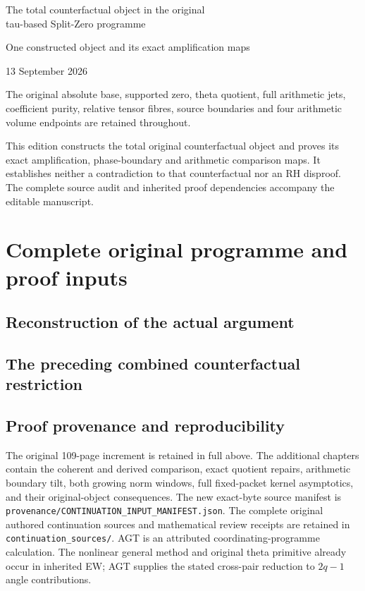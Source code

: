 \documentclass[11pt,a4paper,oneside,openany]{book}
\theoremstyle{definition}
\begin{document}
\frontmatter
\begin{titlepage}
\vspace*{24mm}
{\sffamily\LARGE The total counterfactual object in the original\\[5pt]
tau-based Split-Zero programme\par}
\vspace{12mm}
{\Large One constructed object and its exact amplification maps\par}
\vspace{10mm}
{\large 13 September 2026\par}
\vfill
The original absolute base, supported zero, theta quotient, full arithmetic
jets, coefficient purity, relative tensor fibres, source boundaries and
four arithmetic volume endpoints are retained throughout.

This edition constructs the total original counterfactual object and proves
its exact amplification, phase-boundary and arithmetic comparison maps. It establishes neither a contradiction to that
counterfactual nor an RH disproof. The complete source audit and inherited
proof dependencies accompany the editable manuscript.
\end{titlepage}
\tableofcontents
\mainmatter

\part{Complete original programme and proof inputs}

\chapter{Reconstruction of the actual argument}


\chapter{The preceding combined counterfactual restriction}


\chapter{Proof provenance and reproducibility}
The original 109-page increment is retained in full above. The additional chapters contain the coherent and derived comparison, exact quotient repairs, arithmetic boundary tilt, both growing norm windows, full fixed-packet kernel asymptotics, and their original-object consequences. The new exact-byte source manifest is \nolinkurl{provenance/CONTINUATION_INPUT_MANIFEST.json}. The complete original authored continuation sources and mathematical review receipts are retained in \texttt{continuation\_sources/}. AGT is an attributed coordinating-programme calculation. The nonlinear general method and original theta primitive already occur in inherited EW; AGT supplies the stated cross-pair reduction to $2q-1$ angle contributions.
\end{document}
